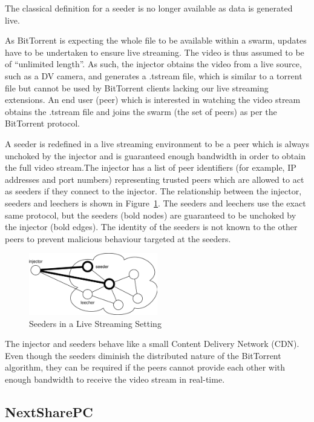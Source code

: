 The classical definition for a seeder is no longer available as data is
generated live.

As BitTorrent is expecting the whole file to be available within a swarm,
updates have to be undertaken to ensure live streaming. The video is thus
assumed to be of ``unlimited length''. As such, the injector obtains the
video from a live source, such as a DV camera, and generates a .tstream file,
which is similar to a torrent file but cannot be used by BitTorrent clients
lacking our live streaming extensions. An end user (peer) which is interested
in watching the video stream obtains the .tstream file and joins the swarm
(the set of peers) as per the BitTorrent protocol.

A seeder is redefined in a live streaming environment to be a peer which is
always unchoked by the injector and is guaranteed enough bandwidth in order to
obtain the full video stream.The injector has a list of peer identifiers (for
example, IP addresses and port numbers) representing trusted peers which are
allowed to act as seeders if they connect to the injector. The relationship
between the injector, seeders and leechers is shown in
Figure~\ref{fig:multimedia-dist:ls-injector-seeder}. The seeders and leechers use the exact
same protocol, but the seeders (bold nodes) are guaranteed to be unchoked by
the injector (bold edges). The identity of the seeders is not known to the
other peers to prevent malicious behaviour targeted at the seeders.

\begin{figure}
  \centering
  \includegraphics[width=0.5\textwidth]{src/img/multimedia-dist/ls-injector-seeder}
  \caption{Seeders in a Live Streaming Setting~\cite{design-p2p-live}}
  \label{fig:multimedia-dist:ls-injector-seeder}
\end{figure}

The injector and seeders behave like a small Content Delivery Network (CDN).
Even though the seeders diminish the distributed nature of the BitTorrent
algorithm, they can be required if the peers cannot provide each other with
enough bandwidth to receive the video stream in real-time.

\subsection{NextSharePC}
\label{subsec:multimedia-dist:nextshare-pc}

